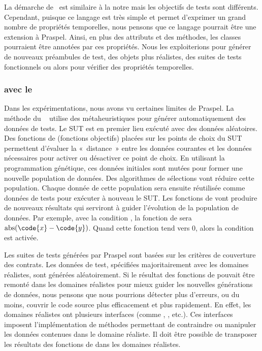 La démarche de~ est similaire à la notre mais les objectifs
de tests sont différents. Cependant, puisque ce langage est très simple et
permet d'exprimer un grand nombre de propriétés temporelles, nous pensons que ce
langage pourrait être une extension à Praspel. Ainsi, en plus des attributs et
des méthodes, les classes pourraient être annotées par ces propriétés. Nous les
exploiterions pour générer de nouveaux préambules de test, des objets plus
réalistes, des suites de tests fonctionnels ou alors pour vérifier des
propriétés temporelles.

\subsubsection{ avec le }

Dans les expérimentations, nous avons vu certaines limites de Praspel. La
méthode du ~ utilise des
métaheuristiques pour générer automatiquement des données de tests. Le SUT est
en premier lieu exécuté avec des données aléatoires. Des fonctions de
 (fonctions objectifs) placées sur les points de choix du SUT
permettent d'évaluer la «~distance~» entre les données courantes et les données
nécessaires pour activer ou désactiver ce point de choix. En utilisant la
programmation génétique, ces données initiales sont mutées pour former une
nouvelle population de données. Des algorithmes de sélections vont réduire cette
population. Chaque donnée de cette population sera ensuite réutilisée comme
données de tests pour exécuter à nouveau le SUT. Les fonctions de
 vont produire de nouveaux résultats qui serviront à guider
l'évolution de la population de données. Par exemple, avec la condition , la fonction de  sera $\mathrm{abs}(\code{x} -
\code{y})$. Quand cette fonction tend vers 0, alors la condition est activée.

Les suites de tests générées par Praspel sont basées sur les critères de
couverture des contrats. Les données de test, spécifiées majoritairement avec
les domaines réalistes, sont générées aléatoirement. Si le résultat des
fonctions de  pouvait être remonté dans les domaines
réalistes pour mieux guider les nouvelles générations de données, nous pensons
que nous pourrions détecter plus d'erreurs, ou du moins, couvrir le code source
plus efficacement et plus rapidement. En effet, les domaines réalistes ont
plusieurs interfaces (comme , , 
etc.). Ces interfaces imposent l'implémentation de méthodes permettant de
contraindre ou manipuler les données contenues dans le domaine réaliste. Il doit
être possible de transposer les résultats des fonctions de 
dans les domaines réalistes.


